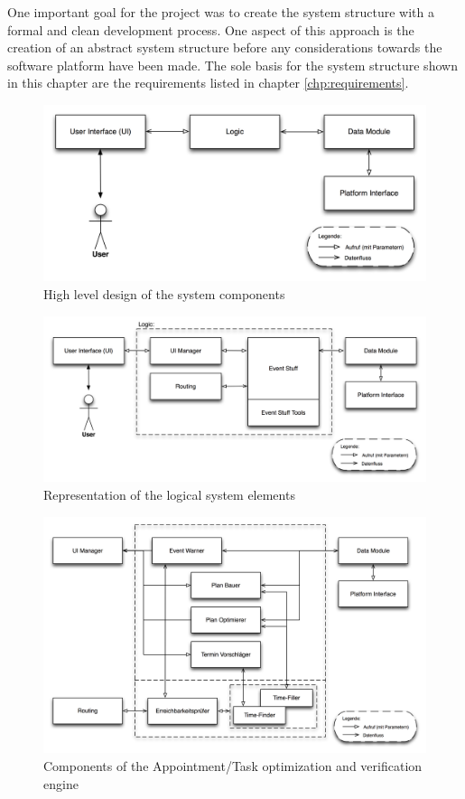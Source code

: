 One important goal for the project was to create the system structure with a formal and clean development process. One aspect of this approach is the creation of an abstract system structure before any considerations towards the software platform have been made. The sole basis for the system structure shown in this chapter are the requirements listed in chapter \ref{chp:requirements}.

\begin{figure}[h!]
\centering
\includegraphics[width=16cm]{pics/top_level_design.png}
\caption{High level design of the system components}
\label{high_level_design}
\end{figure}

\begin{figure}[h!]
\centering
\includegraphics[width=16cm]{pics/logic.png}
\caption{Representation of the logical system elements}
\label{logic}
\end{figure}

\begin{figure}[h!]
\centering
\includegraphics[width=16cm]{pics/event_stuff.png}
\caption{Components of the Appointment/Task optimization and verification engine}
\label{event_stuff}
\end{figure}

